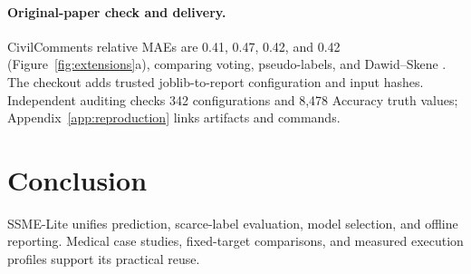 \documentclass[twoside,11pt]{article}
\begin{document}
\paragraph{Original-paper check and delivery.}
CivilComments relative MAEs are 0.41, 0.47, 0.42, and 0.42 (Figure~\ref{fig:extensions}a), comparing voting, pseudo-labels, and Dawid--Skene \citep{dawid1979}. The checkout adds trusted joblib-to-report configuration and input hashes. Independent auditing checks 342 configurations and 8,478 Accuracy truth values; Appendix~\ref{app:reproduction} links artifacts and commands.

\section{Conclusion}
SSME-Lite unifies prediction, scarce-label evaluation, model selection, and offline reporting. Medical case studies, fixed-target comparisons, and measured execution profiles support its practical reuse.

\clearpage
\begingroup
\raggedright
{}
\setlength{\bibhang}{1.5em}
\setlength{\bibsep}{14pt plus 1pt minus 1pt}

\endgroup
\clearpage
\appendix

\end{document}

